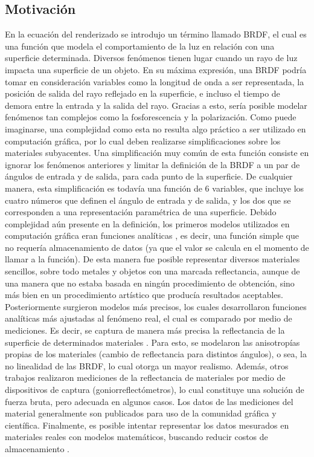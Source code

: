 \subsection{Motivación}
En la ecuación del renderizado se introdujo un término llamado BRDF, el cual es una función que modela el comportamiento de la luz en relación con una superficie determinada.
Diversos fenómenos tienen lugar cuando un rayo de luz impacta una superficie de un objeto.
En su máxima expresión, una BRDF podría tomar en consideración variables como la longitud de onda a ser representada, la posición de salida del rayo reflejado en la superficie, e incluso el tiempo de demora entre la entrada y la salida del rayo.
Gracias a esto, sería posible modelar fenómenos tan complejos como la fosforescencia y la polarización.
Como puede imaginarse, una complejidad como esta no resulta algo práctico a ser utilizado en computación gráfica, por lo cual deben realizarse simplificaciones sobre los materiales subyacentes.
Una simplificación muy común de esta función consiste en ignorar los fenómenos anteriores y limitar la definición de la BRDF a un par de ángulos de entrada y de salida, para cada punto de la superficie.
De cualquier manera, esta simplificación es todavía una función de $6$ variables, que incluye los cuatro números que definen el ángulo de entrada y de salida, y los dos que se corresponden a una representación paramétrica de una superficie.
Debido complejidad aún presente en la definición, los primeros modelos utilizados en computación gráfica eran funciones analíticas \cite{Phong1975,Blinn1977}, es decir, una función simple que no requería almacenamiento de datos (ya que el valor se calcula en el momento de llamar a la función).
De esta manera fue posible representar diversos materiales sencillos, sobre todo metales y objetos con una marcada reflectancia, aunque de una manera que no estaba basada en ningún procedimiento de obtención, sino más bien en un procedimiento artístico que producía resultados aceptables.
Posteriormente surgieron modelos más precisos, los cuales desarrollaron funciones analíticas más ajustadas al fenómeno real, el cual es comparado por medio de mediciones.
Es decir, se captura de manera más precisa la reflectancia de la superficie de determinados materiales \cite{He1991,Ward1992,Lafortune1997}.
Para esto, se modelaron las anisotropías propias de los materiales (cambio de reflectancia para distintos ángulos), o sea, la no linealidad de las BRDF, lo cual otorga un mayor realismo.
Además, otros trabajos \cite{Dana1999,Matusik2003} realizaron mediciones de la reflectancia de materiales por medio de dispositivos de captura (goniorreflectómetros), lo cual constituye una solución de fuerza bruta, pero adecuada en algunos casos.
Los datos de las mediciones del material generalmente son publicados para uso de la comunidad gráfica y científica.
Finalmente, es posible intentar representar los datos mesurados en materiales reales con modelos matemáticos, buscando reducir costos de almacenamiento \cite{Ngan2005}.

